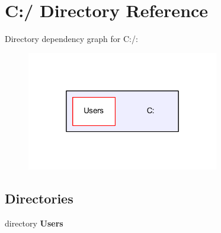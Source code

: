 \section{C\-:/ Directory Reference}
\label{dir_e6bb53534ac0e427887cf7a94c0c004e}
Directory dependency graph for C\-:/\-:\nopagebreak
\begin{figure}[H]
\begin{center}
\leavevmode
\includegraphics[width=238pt]{dir_e6bb53534ac0e427887cf7a94c0c004e_dep}
\end{center}
\end{figure}
\subsection*{Directories}
\begin{DoxyCompactItemize}
\item 
directory {\bf Users}
\end{DoxyCompactItemize}

